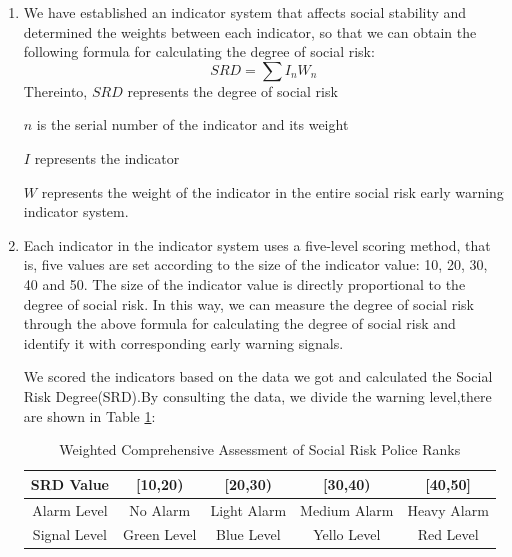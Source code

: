 \documentclass[12pt]{article}  %
\begin{document}
\begin{enumerate}
	\renewcommand{\labelenumi}{\textbf{Step \theenumi}}
\item We have established an indicator system that affects social stability and determined the weights between each indicator, so that we can obtain the following formula for calculating the degree of social risk:
\begin{equation}
	SRD=\sum I_nW_n
	\label{eq}
\end{equation}
Thereinto, $SRD$ represents the degree of social risk

\hspace{4.25em}$n$ is the serial number of the indicator and its weight

\hspace{4.25em}$I$ represents the indicator

\hspace{4.25em}$W$ represents the weight of the indicator in the entire social risk early warning indicator system.
\item Each indicator in the indicator system uses a five-level scoring method, that is, five values are set according to the size of the indicator value: 10, 20, 30, 40 and 50. The size of the indicator value is directly proportional to the degree of social risk. In this way, we can measure the degree of social risk through the above formula for calculating the degree of social risk and identify it with corresponding early warning signals.

We scored the indicators based on the data we got and calculated the Social Risk Degree(SRD).By consulting the data, we divide the warning level,there are shown in Table \ref{srd}:
\begin{table}[!ht]  
    \centering
    \caption{Weighted Comprehensive Assessment of Social Risk Police Ranks}
    \label{srd}
    \begin{tabular}{ccccc}
    \hline
        SRD Value & [10,20) & [20,30) & [30,40) & [40,50] \\\hline 
        Alarm Level & No Alarm & Light Alarm & Medium Alarm & Heavy Alarm \\ 
        Signal Level& Green Level& Blue Level& Yello Level& Red Level\\ \hline
    \end{tabular} 
\end{table}
\end{enumerate}
\end{document}
